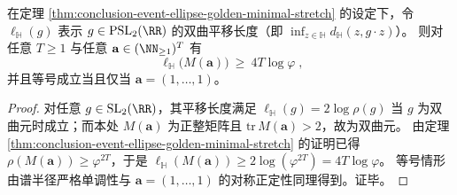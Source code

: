 \begin{corollary}[双曲平移长度的线性下界与唯一极小轨]\label{cor:conclusion-event-hyperbolic-translation-golden-minimal}
在定理 \ref{thm:conclusion-event-ellipse-golden-minimal-stretch} 的设定下，令
\(\ell_{\mathbb H}(g)\) 表示 \(g\in \mathrm{PSL}_2(\RR)\) 的双曲平移长度（即 \(\inf_{z\in\mathbb H}d_{\mathbb H}(z,g\cdot z)\)）。
则对任意 \(T\ge 1\) 与任意 \(\mathbf a\in(\NN_{\ge 1})^T\) 有
\[
\boxed{\;
\ell_{\mathbb H}\!\bigl(M(\mathbf a)\bigr)\ \ge\ 4T\log\varphi\;},
\]
并且等号成立当且仅当 \(\mathbf a=(1,\dots,1)\)。
\end{corollary}
\begin{proof}
对任意 \(g\in \mathrm{SL}_2(\RR)\)，其平移长度满足
\(
\ell_{\mathbb H}(g)=2\log\rho(g)
\)
当 \(g\) 为双曲元时成立；而本处 \(M(\mathbf a)\) 为正整矩阵且 \(\mathrm{tr}\,M(\mathbf a)>2\)，故为双曲元。
由定理 \ref{thm:conclusion-event-ellipse-golden-minimal-stretch} 的证明已得 \(\rho(M(\mathbf a))\ge \varphi^{2T}\)，于是
\(
\ell_{\mathbb H}(M(\mathbf a))\ge 2\log(\varphi^{2T})=4T\log\varphi
\)。
等号情形由谱半径严格单调性与 \(\mathbf a=(1,\dots,1)\) 的对称正定性同理得到。证毕。
\end{proof}
